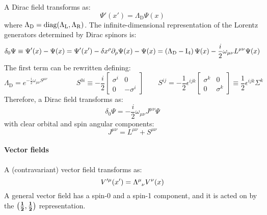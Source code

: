 A Dirac field transforms as:
\begin{equation}
  \Psi'(x') = \Lambda_\text{D} \Psi(x)
\end{equation}
where $ \Lambda_\text{D} = \operatorname{diag}(\Lambda_\text{L} , \Lambda_\text{R}) $. The infinite-dimensional representation of the Lorentz generators determined by Dirac spinors is:
\begin{equation*}
  \delta_0 \Psi \equiv \Psi'(x) - \Psi(x) = \Psi'(x') - \delta x^\rho \partial_\rho \Psi(x) - \Psi(x) = \left( \Lambda_\text{D} - \mathrm{I}_4 \right) \Psi(x) - \frac{i}{2} \omega_{\mu \nu} L^{\mu \nu} \Psi(x)
\end{equation*}
The first term can be rewritten defining:
\begin{equation*}
  \Lambda_\text{D} = e^{-\frac{i}{2} \omega_{\mu \nu} S^{\mu \nu}}
  \qquad \qquad
  S^{0i} \equiv - \frac{i}{2}
  \begin{bmatrix}
    \sigma^i & 0 \\ 0 & -\sigma^i
  \end{bmatrix}
  \qquad
  S^{ij} = - \frac{1}{2} \epsilon^{ijk}
  \begin{bmatrix}
    \sigma^k & 0 \\ 0 & \sigma^k
  \end{bmatrix}
  \equiv \frac{1}{2} \epsilon^{ijk} \Sigma^k
\end{equation*}
Therefore, a Dirac field transforms as:
\begin{equation}
  \delta_0 \Psi = - \frac{i}{2} \omega_{\mu \nu} J^{\mu \nu} \Psi
  \label{eq:dir-field-change}
\end{equation}
with clear orbital and spin angular components:
\begin{equation}
  J^{\mu \nu} = L^{\mu \nu} + S^{\mu \nu}
  \label{eq:dir-field-tot-ang-mom}
\end{equation}

\paragraph{Vector fields}

A (contravariant) vector field transforms as:
\begin{equation}
  V'^\mu(x') = \tensor{\Lambda}{^\mu_\nu} V^\nu(x)
\end{equation}
A general vector field has a spin-0 and a spin-1 component, and it is acted on by the $ \mathbf{\left( \frac{1}{2},\frac{1}{2} \right)} $ representation.

\newpage

